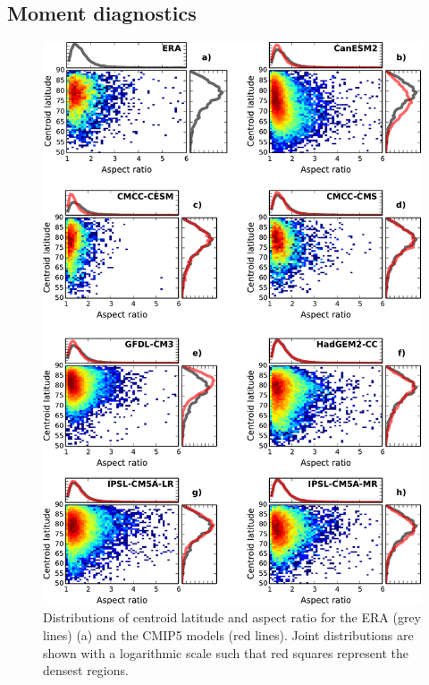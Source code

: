 \subsection{Moment diagnostics}
\label{sec:moment-diagnostics}

\begin{figure}[htbp]
 \centering
 \noindent\includegraphics[width=\textwidth]{figures/chapter-models/moments_stats1.pdf}
 \caption[Distributions of moment diagnostics for the CMIP5
 models.]{Distributions of centroid latitude and aspect ratio for the ERA (grey
   lines) (a) and the CMIP5 models (red lines). Joint distributions are shown
   with a logarithmic scale such that red squares represent the densest
   regions.}
 \label{fig:cmip5_moments_stats}
\end{figure}

